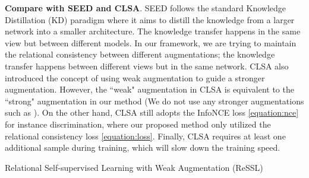 \documentclass{article}
\newcommand{\<}{\left\langle}
\renewcommand{\>}{\right\rangle}
\begin{document}
\textbf{Compare with SEED and CLSA}. SEED \cite{seed} follows the standard Knowledge Distillation (KD) paradigm \cite{hinton2015distilling,romero2014fitnets,you2017learning} where it aims to distill the knowledge from a larger network into a smaller architecture. The knowledge transfer happens in the same view but between different models. In our framework, we are trying to maintain the relational consistency between different augmentations; the knowledge transfer happens between different views but in the same network. CLSA \cite{stronger} also introduced the concept of using weak augmentation to guide a stronger augmentation. However, the ``weak" augmentation in CLSA is equivalent to the ``strong" augmentation in our method (We do not use any stronger augmentations such as \cite{autoaugment, randaugment}). On the other hand, CLSA still adopts the InfoNCE loss \eqref{equation:nce} for instance discrimination, where our proposed method only utilized the relational consistency loss \eqref{equation:loss}. Finally, CLSA requires at least one additional sample during training, which will slow down the training speed.


\begin{algorithm}
\SetAlgoLined
{}
 {
}
\caption{Relational Self-supervised Learning with Weak Augmentation (ReSSL)}
\label{alg:overall}
\end{algorithm}






 \vspace{-10pt}
\end{document}
